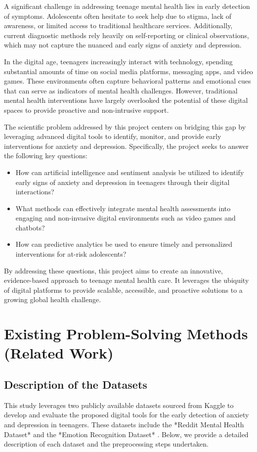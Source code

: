 \documentclass[runningheads,a4paper,11pt]{report}
\begin{document}
A significant challenge in addressing teenage mental health lies in early detection of symptoms. Adolescents often hesitate to seek help due to stigma, lack of awareness, or limited access to traditional healthcare services. Additionally, current diagnostic methods rely heavily on self-reporting or clinical observations, which may not capture the nuanced and early signs of anxiety and depression.

In the digital age, teenagers increasingly interact with technology, spending substantial amounts of time on social media platforms, messaging apps, and video games. These environments often capture behavioral patterns and emotional cues that can serve as indicators of mental health challenges. However, traditional mental health interventions have largely overlooked the potential of these digital spaces to provide proactive and non-intrusive support.

The scientific problem addressed by this project centers on bridging this gap by leveraging advanced digital tools to identify, monitor, and provide early interventions for anxiety and depression. Specifically, the project seeks to answer the following key questions:
\begin{itemize}
    \item How can artificial intelligence and sentiment analysis be utilized to identify early signs of anxiety and depression in teenagers through their digital interactions?
    \item What methods can effectively integrate mental health assessments into engaging and non-invasive digital environments such as video games and chatbots?
    \item How can predictive analytics be used to ensure timely and personalized interventions for at-risk adolescents?
\end{itemize}

By addressing these questions, this project aims to create an innovative, evidence-based approach to teenage mental health care. It leverages the ubiquity of digital platforms to provide scalable, accessible, and proactive solutions to a growing global health challenge.


\chapter{Existing Problem-Solving Methods (Related Work)}
\label{chapter:existing-problem}

\section{Description of the Datasets}
\label{section:description}
This study leverages two publicly available datasets sourced from Kaggle to develop and evaluate the proposed digital tools for the early detection of anxiety and depression in teenagers. These datasets include the *Reddit Mental Health Dataset* \cite{reddit_dataset} and the *Emotion Recognition Dataset* \cite{emotion_dataset}. Below, we provide a detailed description of each dataset and the preprocessing steps undertaken.
\end{document}
